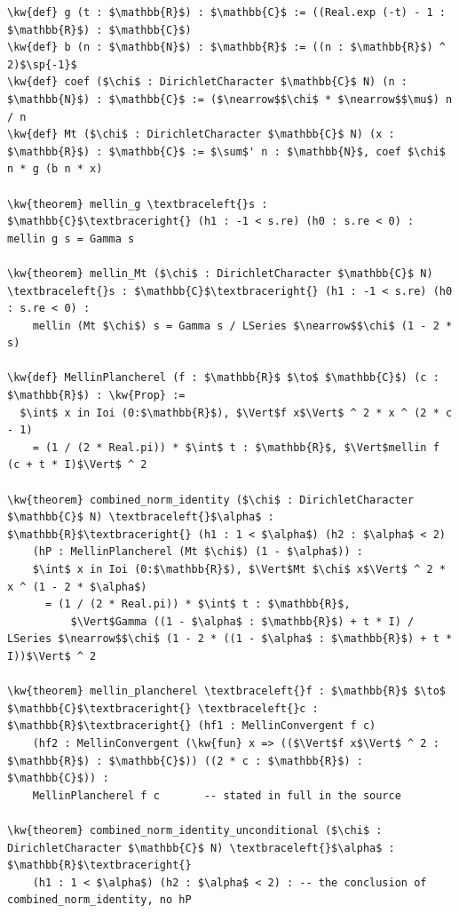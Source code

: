 \documentclass[11pt]{amsart}
\theoremstyle{definition}
\theoremstyle{remark}
\newcommand{\kw}[1]{\textcolor{leankw}{\textbf{#1}}}
\begin{document}
\begin{Verbatim}
\kw{def} g (t : $\mathbb{R}$) : $\mathbb{C}$ := ((Real.exp (-t) - 1 : $\mathbb{R}$) : $\mathbb{C}$)
\kw{def} b (n : $\mathbb{N}$) : $\mathbb{R}$ := ((n : $\mathbb{R}$) ^ 2)$\sp{-1}$
\kw{def} coef ($\chi$ : DirichletCharacter $\mathbb{C}$ N) (n : $\mathbb{N}$) : $\mathbb{C}$ := ($\nearrow$$\chi$ * $\nearrow$$\mu$) n / n
\kw{def} Mt ($\chi$ : DirichletCharacter $\mathbb{C}$ N) (x : $\mathbb{R}$) : $\mathbb{C}$ := $\sum$' n : $\mathbb{N}$, coef $\chi$ n * g (b n * x)

\kw{theorem} mellin_g \textbraceleft{}s : $\mathbb{C}$\textbraceright{} (h1 : -1 < s.re) (h0 : s.re < 0) : mellin g s = Gamma s

\kw{theorem} mellin_Mt ($\chi$ : DirichletCharacter $\mathbb{C}$ N) \textbraceleft{}s : $\mathbb{C}$\textbraceright{} (h1 : -1 < s.re) (h0 : s.re < 0) :
    mellin (Mt $\chi$) s = Gamma s / LSeries $\nearrow$$\chi$ (1 - 2 * s)

\kw{def} MellinPlancherel (f : $\mathbb{R}$ $\to$ $\mathbb{C}$) (c : $\mathbb{R}$) : \kw{Prop} :=
  $\int$ x in Ioi (0:$\mathbb{R}$), $\Vert$f x$\Vert$ ^ 2 * x ^ (2 * c - 1)
    = (1 / (2 * Real.pi)) * $\int$ t : $\mathbb{R}$, $\Vert$mellin f (c + t * I)$\Vert$ ^ 2

\kw{theorem} combined_norm_identity ($\chi$ : DirichletCharacter $\mathbb{C}$ N) \textbraceleft{}$\alpha$ : $\mathbb{R}$\textbraceright{} (h1 : 1 < $\alpha$) (h2 : $\alpha$ < 2)
    (hP : MellinPlancherel (Mt $\chi$) (1 - $\alpha$)) :
    $\int$ x in Ioi (0:$\mathbb{R}$), $\Vert$Mt $\chi$ x$\Vert$ ^ 2 * x ^ (1 - 2 * $\alpha$)
      = (1 / (2 * Real.pi)) * $\int$ t : $\mathbb{R}$,
          $\Vert$Gamma ((1 - $\alpha$ : $\mathbb{R}$) + t * I) / LSeries $\nearrow$$\chi$ (1 - 2 * ((1 - $\alpha$ : $\mathbb{R}$) + t * I))$\Vert$ ^ 2

\kw{theorem} mellin_plancherel \textbraceleft{}f : $\mathbb{R}$ $\to$ $\mathbb{C}$\textbraceright{} \textbraceleft{}c : $\mathbb{R}$\textbraceright{} (hf1 : MellinConvergent f c)
    (hf2 : MellinConvergent (\kw{fun} x => (($\Vert$f x$\Vert$ ^ 2 : $\mathbb{R}$) : $\mathbb{C}$)) ((2 * c : $\mathbb{R}$) : $\mathbb{C}$)) :
    MellinPlancherel f c       -- stated in full in the source

\kw{theorem} combined_norm_identity_unconditional ($\chi$ : DirichletCharacter $\mathbb{C}$ N) \textbraceleft{}$\alpha$ : $\mathbb{R}$\textbraceright{}
    (h1 : 1 < $\alpha$) (h2 : $\alpha$ < 2) : -- the conclusion of combined_norm_identity, no hP


\end{Verbatim}
\end{document}
